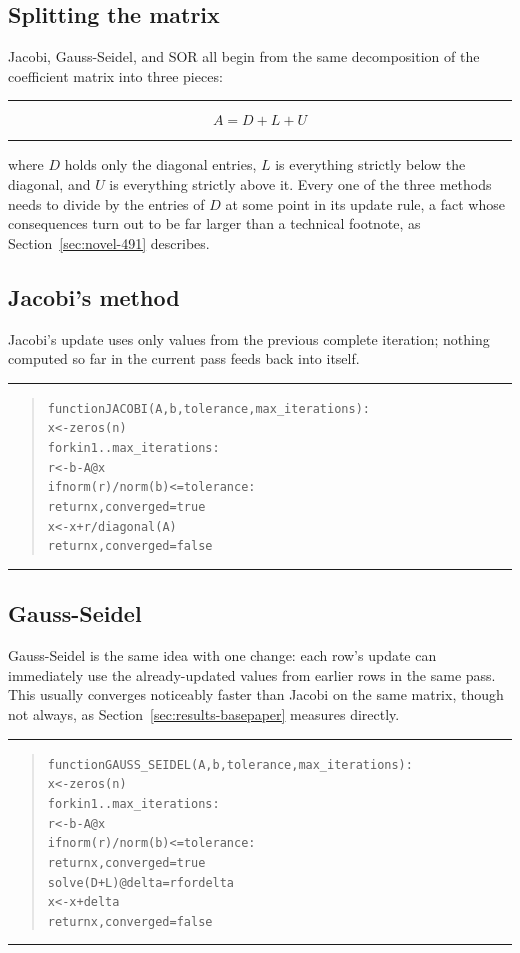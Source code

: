 \documentclass[11pt,a4paper]{article}
\newenvironment{formulabox}
  {\begin{center}\color{SBteal}\rule{0.92\linewidth}{0.8pt}\par\vspace{5pt}\color{SBnavy}}
  {\par\vspace{3pt}\color{SBteal}\rule{0.92\linewidth}{0.8pt}\end{center}}
\newenvironment{pseudobox}
  {\begin{center}\color{SBgold}\rule{0.92\linewidth}{0.8pt}\end{center}\vspace{-2pt}
   \begin{quote}\small\color{SBnavy}
   \begin{alltt}\ttfamily}
  {\end{alltt}\end{quote}\vspace{-6pt}\begin{center}\color{SBgold}\rule{0.92\linewidth}{0.8pt}\end{center}}
\begin{document}
\subsection{Splitting the matrix}
\label{sec:methods-splitting}

Jacobi, Gauss-Seidel, and SOR all begin from the same decomposition of the coefficient
matrix into three pieces:

\begin{formulabox}
$$A = D + L + U$$
\end{formulabox}

where $D$ holds only the diagonal entries, $L$ is everything strictly below the diagonal,
and $U$ is everything strictly above it. Every one of the three methods needs to divide by
the entries of $D$ at some point in its update rule, a fact whose consequences turn out to
be far larger than a technical footnote, as Section~\ref{sec:novel-491} describes.

\subsection{Jacobi's method}
\label{sec:methods-jacobi}

Jacobi's update uses only values from the previous complete iteration; nothing computed
so far in the current pass feeds back into itself.

\begin{pseudobox}
function JACOBI(A, b, tolerance, max_iterations):
    x <- zeros(n)
    for k in 1 .. max_iterations:
        r <- b - A @ x
        if norm(r) / norm(b) <= tolerance:
            return x, converged = true
        x <- x + r / diagonal(A)
    return x, converged = false
\end{pseudobox}

\subsection{Gauss-Seidel}
\label{sec:methods-gs}

Gauss-Seidel is the same idea with one change: each row's update can immediately use the
already-updated values from earlier rows in the same pass. This usually converges
noticeably faster than Jacobi on the same matrix, though not always, as
Section~\ref{sec:results-basepaper} measures directly.

\begin{pseudobox}
function GAUSS_SEIDEL(A, b, tolerance, max_iterations):
    x <- zeros(n)
    for k in 1 .. max_iterations:
        r <- b - A @ x
        if norm(r) / norm(b) <= tolerance:
            return x, converged = true
        solve (D + L) @ delta = r   for delta
        x <- x + delta
    return x, converged = false
\end{pseudobox}
\end{document}
